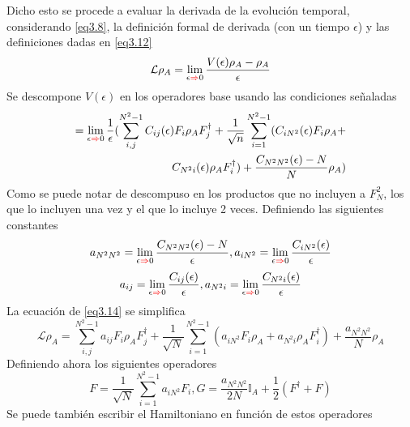 \documentclass{book}
\begin{document}
Dicho esto se procede a evaluar la derivada de la evolución temporal, considerando \textcolor{blue}{\ref{eq3.8}}, la definición formal de derivada (con un tiempo $\epsilon$) y las definiciones dadas en \textcolor{blue}{\ref{eq3.12}}
\begin{equation}\label{eq3.13}\mathcal{L}\rho_A= \lim\limits_{\epsilon\textcolor{red}{\Rightarrow} 0}\frac{V(\epsilon)\rho_A-\rho_A}{\epsilon}\end{equation}
Se descompone $V(\epsilon)$ en los operadores base usando las condiciones señaladas
\begin{equation}\label{eq3.14}\begin{aligned}=\lim\limits_{\epsilon\textcolor{red}{\Rightarrow} 0}\frac{1}{\epsilon}(\sum_{i,j}^{N^2-1} C_{ij}(\epsilon)F_i\rho_AF_j^\dag+\frac{1}{\sqrt{n}}\sum_{i=1}^{N^2-1}(C_{iN^2}(\epsilon)F_i\rho_A+\\ C_{N^2i}(\epsilon)\rho_AF_i^\dag)+\frac{C_{N^2N^2}(\epsilon)-N}{N}\rho_A)\end{aligned}\end{equation}
Como se puede notar de descompuso en los productos que no incluyen a $F_N^2$, los que lo incluyen una vez y el que lo incluye 2 veces. Definiendo las siguientes constantes
\begin{equation}\label{eq3.15} a_{N^2N^2}=\lim\limits_{\epsilon\textcolor{red}{\Rightarrow} 0}\frac{C_{N^2N^2}(\epsilon)-N}{\epsilon}, a_{iN^2}=\lim\limits_{\epsilon\textcolor{red}{\Rightarrow} 0}\frac{C_{iN^2}(\epsilon)}{\epsilon} \end{equation}
\begin{equation}\label{eq3.16} a_{ij}=\lim\limits_{\epsilon\textcolor{red}{\Rightarrow} 0}\frac{C_{ij}(\epsilon)}{\epsilon}, a_{ N^2 i}=\lim\limits_{\epsilon\textcolor{red}{\Rightarrow} 0}\frac{C_{N^2 i}(\epsilon)}{\epsilon} \end{equation}
La ecuación de \textcolor{blue}{\ref{eq3.14}} se simplifica
\begin{equation}\label{eq3.17}\mathcal{L}\rho_A=\sum_{i,j}^{N^2-1}a_{ij}F_i\rho_AF_j^\dag+\frac{1}{\sqrt{N}}\sum_{i=1}^{N^2-1}(a_{iN^2}F_i\rho_A+a_{N^2i}\rho_AF_i^\dag)+\frac{a_{N^2N^2}}{N}\rho_A\end{equation}
Definiendo ahora los siguientes operadores
\begin{equation}\label{eq3.18} F=\frac{1}{\sqrt{N}}\sum_{i=1}^{N^2-1}a_{iN^2}F_i, G=\frac{a_{N^2N^2}}{2N}\mathbb{I}_A+\frac{1}{2}(F^\dag+F)\end{equation}
Se puede también escribir el Hamiltoniano en función de estos operadores
\end{document}
